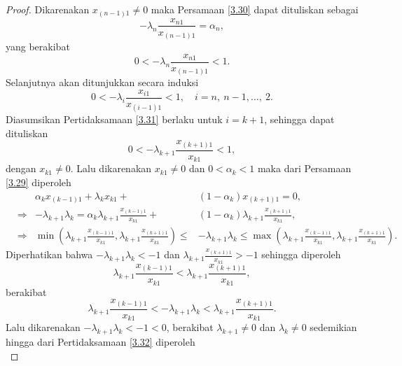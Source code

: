 \begin{proof}
    Dikarenakan $x_{(n-1)1} \neq 0$ maka Persamaan \eqref{3.30} dapat dituliskan sebagai
    \begin{equation*}
        -\lambda_n\frac{x_{n1}}{x_{(n-1)1}} = \alpha_n,
    \end{equation*}
    yang berakibat
    \begin{equation*}
        0 < -\lambda_n\frac{x_{n1}}{x_{(n-1)1}} < 1.
    \end{equation*}
    Selanjutnya akan ditunjukkan secara induksi
    \begin{equation}
        0 < -\lambda_i\frac{x_{i1}}{x_{(i-1)1}} < 1, \quad i=n,~n-1,\dots,~2. \label{3.31}
    \end{equation}
    Diasumsikan Pertidaksamaan \eqref{3.31} berlaku untuk $i=k+1$, sehingga dapat dituliskan
    \begin{equation*}
        0 < -\lambda_{k+1}\frac{x_{(k+1)1}}{x_{k1}} < 1,
    \end{equation*}
    dengan $x_{k1} \neq 0$. Lalu dikarenakan $x_{k1} \neq 0$ dan $0<\alpha_k<1$ maka dari Persamaan \eqref{3.29} diperoleh
    \begin{align*}
         &&\alpha_kx_{(k-1)1} + \lambda_kx_{k1} +& (1 - \alpha_k)x_{(k+1)1} = 0, \\
         &\Longrightarrow&-\lambda_{k+1}\lambda_{k}=\alpha_k\lambda_{k+1}\frac{x_{(k-1)1}}{x_{k1}} +& (1 - \alpha_k)\lambda_{k+1}\frac{x_{(k+1)1}}{x_{k1}}, \\
         &\Longrightarrow&\min(\lambda_{k+1}\frac{x_{(k-1)1}}{x_{k1}},\lambda_{k+1}\frac{x_{(k+1)1}}{x_{k1}}) \leq & -\lambda_{k+1}\lambda_{k} \leq \max(\lambda_{k+1}\frac{x_{(k-1)1}}{x_{k1}},\lambda_{k+1}\frac{x_{(k+1)1}}{x_{k1}}).
    \end{align*}
    Diperhatikan bahwa $-\lambda_{k+1}\lambda_{k} < -1$ dan $\lambda_{k+1}\frac{x_{(k+1)1}}{x_{k1}} > -1$ sehingga diperoleh 
    \begin{equation*}
        \lambda_{k+1}\frac{x_{(k-1)1}}{x_{k1}} < \lambda_{k+1}\frac{x_{(k+1)1}}{x_{k1}},
    \end{equation*}
    berakibat
    \begin{equation}\label{3.32}
        \lambda_{k+1}\frac{x_{(k-1)1}}{x_{k1}} < -\lambda_{k+1}\lambda_{k} < \lambda_{k+1}\frac{x_{(k+1)1}}{x_{k1}}.
    \end{equation}
    Lalu dikarenakan $-\lambda_{k+1}\lambda_{k} < -1 < 0$, berakibat $\lambda_{k+1} \neq 0$ dan $\lambda_{k} \neq 0$ sedemikian hingga dari Pertidaksamaan \eqref{3.32} diperoleh
    \begin{equation*}

\end{equation*}
\end{proof}
